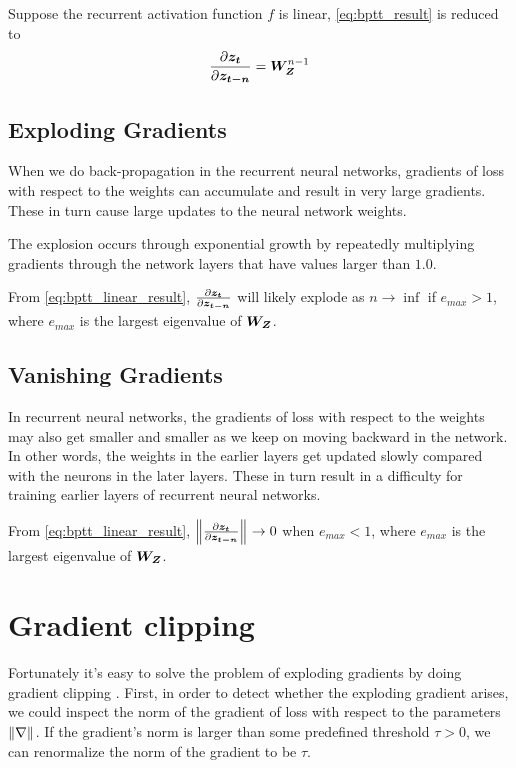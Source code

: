 Suppose the recurrent activation function $f$ is linear, \cref{eq:bptt_result} is reduced to
\begin{equation} \label{eq:bptt_linear_result}
\frac{\partial \vect{z_t}}{\partial \vect{z_{t-n}}} = \matr{W_Z}^{n-1}
\end{equation}


\subsection{Exploding Gradients}
When we do back-propagation in the recurrent neural networks, gradients of loss with respect to the weights can accumulate and result in very large gradients.
These in turn cause large updates to the neural network weights.


The explosion occurs through exponential growth by repeatedly multiplying gradients through the network layers that have values larger than $1.0$.

From \cref{eq:bptt_linear_result}, $\frac{\partial \vect{z_t}}{\partial \vect{z_{t-n}}}$ will likely explode as $n \rightarrow \inf$ if $e_{max} > 1$, where $e_{max}$ is the largest eigenvalue of $\matr{W_Z}$.

\subsection{Vanishing Gradients}
In recurrent neural networks, the gradients of loss with respect to the weights may also get smaller and smaller as we keep on moving backward in the network. 
In other words, the weights in the earlier layers get updated slowly compared with the neurons in the later layers.
These in turn result in a difficulty for training earlier layers of recurrent neural networks.

From \cref{eq:bptt_linear_result}, $\norm{\frac{\partial \vect{z_t}}{\partial \vect{z_{t-n}}}} \rightarrow 0$ when $e_{max} < 1$, where $e_{max}$ is the largest eigenvalue of $\matr{W_Z}$.

\section{Gradient clipping}
Fortunately it's easy to solve the problem of exploding gradients by doing gradient clipping \cite{1211.5063}.
First, in order to detect whether the exploding gradient arises, we could inspect the norm of the gradient of loss with respect to the parameters $\norm{\nabla}$.
If the gradient's norm is larger than some predefined threshold $\tau > 0$, we can renormalize the norm of the gradient to be $\tau$.

